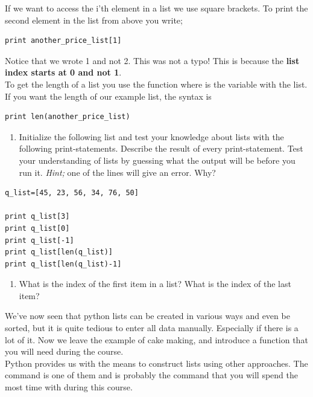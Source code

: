 \documentclass{article}
\begin{document}

If we want to access the i'th element in a list
we use square brackets. To print the second element
in the list from above you write;

\begin{lstlisting}
print another_price_list[1]
\end{lstlisting}

Notice that we wrote 1 and not 2. This was not a typo!
This is because the {\bf{list index starts at 0 and not 1}}.\\

To get the length of a list you use the function 
where  is the variable with the list.
If you want the length of our example list, the syntax is

\begin{lstlisting}
print len(another_price_list)
\end{lstlisting}

\begin{enumerate}[resume]
  \item Initialize the following list and test your knowledge about
    lists with the following print-statements.
    Describe the result of every print-statement. Test your
    understanding of lists by guessing what the output will be before
    you run it. 
    {\em Hint;} one of the lines will give an error. Why? \label{list operations}
\end{enumerate} 
\begin{lstlisting}
q_list=[45, 23, 56, 34, 76, 50]

print q_list[3]
print q_list[0]
print q_list[-1]
print q_list[len(q_list)]
print q_list[len(q_list)-1]
\end{lstlisting}

\begin{enumerate}[resume]
  \item What is the index of the first item in a list? What is the index of
    the last item?

\end{enumerate}

We've now seen that python lists can be created in various ways and even be
sorted, but it is quite tedious to enter all data manually. Especially if
there is a lot of it. Now we leave the example of cake making, and introduce a function that you will need during the course. \\

Python provides us with the means to construct
lists using other approaches.
The  command is one of them and is probably the
command that you will spend the most time with during this course.
\end{document}
